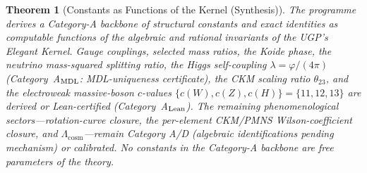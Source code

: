 \documentclass[12pt]{article}
\newtheorem{theorem}{Theorem}[section]
\begin{document}
\begin{theorem}[Constants as Functions of the Kernel (Synthesis)]
\label{thm:constants_from_kernel}
The programme derives a Category-A backbone of structural constants and exact identities as computable functions of the algebraic and rational invariants of the UGP's Elegant Kernel.
Gauge couplings, selected mass ratios, the Koide phase, the neutrino mass-squared splitting ratio, the Higgs self-coupling $\lambda = \varphi/(4\pi)$ (Category~A$_{\rm MDL}$: MDL-uniqueness certificate), the CKM scaling ratio $\theta_{23}$, and the electroweak massive-boson $c$-values $\{c(W),c(Z),c(H)\} = \{11,12,13\}$ are derived or Lean-certified (Category~A$_{\rm Lean}$).
The remaining phenomenological sectors---rotation-curve closure, the per-element CKM/PMNS Wilson-coefficient closure, and $\Lambda_{\mathrm{cosm}}$---remain Category A/D (algebraic identifications pending mechanism) or calibrated.
No constants in the Category-A backbone are free parameters of the theory.
\end{theorem}
\end{document}
